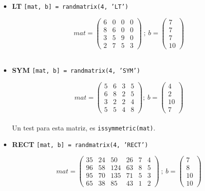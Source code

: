 \documentclass[11pt, spanish]{article}
\begin{document}
\begin{enumerate}
\begin{itemize}
\item \textbf{LT} \texttt{[mat, b] = randmatrix(4, 'LT')}
 
 $$mat = \left(\begin{array}{cccc} 6 & 0 & 0 & 0\\ 8 & 6 & 0 & 0\\ 3 & 5 & 9 & 0\\ 2 & 7 & 5 & 3 \end{array}\right)\ ;\ b = \left(\begin{array}{c} 7\\ 7\\ 7\\ 10 \end{array}\right)$$\\
 
\item \textbf{SYM} \texttt{[mat, b] = randmatrix(4, 'SYM')}

$$mat =  \left(\begin{array}{cccc} 5 & 6 & 3 & 5\\ 6 & 8 & 2 & 5\\ 3 & 2 & 2 & 4\\ 5 & 5 & 4 & 8 \end{array}\right);\ b = \left(\begin{array}{c} 4\\ 2\\ 10\\ 7 \end{array}\right)
$$\\

Un test para esta matriz, es \texttt{issymmetric(mat)}.\\

\item \textbf{RECT} \texttt{[mat, b] = randmatrix(4, 'RECT')}

$$mat = \left(\begin{array}{cccccc} 35 & 24 & 50 & 26 & 7 & 4\\ 96 & 58 & 124 & 63 & 8 & 5\\ 95 & 70 & 135 & 71 & 5 & 3\\ 65 & 38 & 85 & 43 & 1 & 2 \end{array}\right)\ ;\ b = \left(\begin{array}{c} 7\\ 8\\ 10\\ 10 \end{array}\right)
$$\\


\end{itemize}
\end{enumerate}
\end{document}

